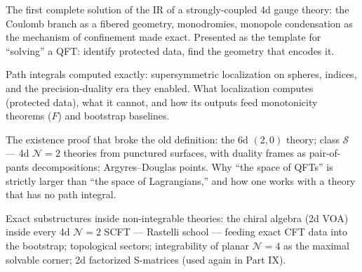 The first complete solution of the IR of a strongly-coupled 4d gauge theory: the Coulomb branch as a fibered geometry, monodromies, monopole condensation as the mechanism of confinement made exact. Presented as the template for ``solving'' a QFT: identify protected data, find the geometry that encodes it.

Path integrals computed exactly: supersymmetric localization on spheres, indices, and the precision-duality era they enabled. What localization computes (protected data), what it cannot, and how its outputs feed monotonicity theorems ($F$) and bootstrap baselines.

The existence proof that broke the old definition: the 6d $(2,0)$ theory; class $\mathcal{S}$ --- 4d $\mathcal{N}=2$ theories from punctured surfaces, with duality frames as pair-of-pants decompositions; Argyres--Douglas points. Why ``the space of QFTs'' is strictly larger than ``the space of Lagrangians,'' and how one works with a theory that has no path integral.

Exact substructures inside non-integrable theories: the chiral algebra (2d VOA) inside every 4d $\mathcal{N}=2$ SCFT --- Rastelli school --- feeding exact CFT data into the bootstrap; topological sectors; integrability of planar $\mathcal{N}=4$ as the maximal solvable corner; 2d factorized S-matrices (used again in Part IX).

